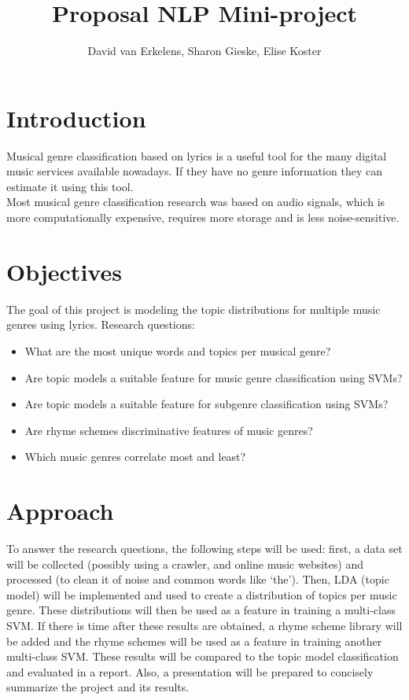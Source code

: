 \documentclass[12pt,a4paper]{amsart}
\title{Proposal NLP Mini-project}
\author{David van Erkelens, Sharon Gieske, Elise Koster}
\date{}
\begin{document}
\maketitle

\section{Introduction}

Musical genre classification based on lyrics is a useful tool for the many digital music services available nowadays. If they have no genre information they can estimate it using this tool. \\
Most musical genre classification research was based on audio signals, which is more computationally expensive, requires more storage and is less noise-sensitive. \\


\section{Objectives}
The goal of this project is modeling the topic distributions for multiple music genres using lyrics. 
Research questions:
\begin{itemize}
\item What are the most unique words and topics per musical genre?
\item Are topic models a suitable feature for music genre classification using SVMs?
\item Are topic models a suitable feature for subgenre classification using SVMs?
\item Are rhyme schemes discriminative features of music genres?
\item Which music genres correlate most and least?
\end{itemize}

\section{Approach}
To answer the research questions, the following steps will be used: first, a data set will be collected (possibly using a crawler, and online music websites) and processed (to clean it of noise and common words like `the'). Then, LDA (topic model) will be implemented and used to create a distribution of topics per music genre. These distributions will then be used as a feature in training a multi-class SVM. If there is time after these results are obtained, a rhyme scheme library will be added and the rhyme schemes will be used as a feature in training another multi-class SVM. These results will be compared to the topic model classification and evaluated in a report. Also, a presentation will be prepared to concisely summarize the project and its results.
\end{document}
